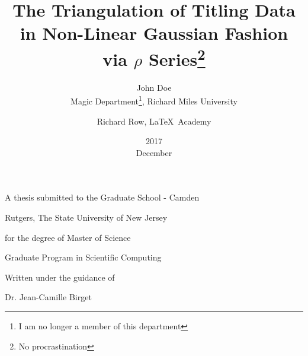 \documentclass{article}%
\begin{document}
\begin{titlepage}
  \title{The Triangulation of Titling Data in Non-Linear Gaussian Fashion via $\rho$ Series\thanks{No procrastination}}
  \date{2017\\ December}
  \author{John Doe\\ Magic Department\thanks{I am no longer a member of this department}, Richard Miles University
  \and Richard Row, \LaTeX\ Academy}
  \centering
  \vfill
  A thesis submitted to the Graduate School - Camden \par
  Rutgers, The State University of New Jersey \par
  \vspace{1cm}
  for the degree of Master of Science \par
  \vspace{1cm}
  Graduate Program in Scientific Computing \par
  \vspace{1cm}
  Written under the guidance of\par
  Dr. Jean-Camille Birget
  \vfill
\end{titlepage}
\end{document}
